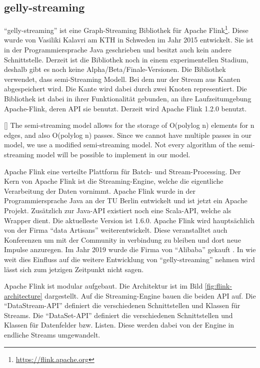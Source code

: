 \subsection{gelly-streaming}
\enquote{gelly-streaming} ist eine Graph-Streaming Bibliothek für Apache Flink\footnote{\url{https://flink.apache.org}}.
Diese wurde von Vasiliki Kalavri am KTH in Schweden im Jahr 2015 entwickelt.
Sie ist in der Programmiersprache Java geschrieben und besitzt auch kein andere
Schnittstelle. Derzeit ist die Bibliothek noch in einem experimentellen Stadium,
deshalb gibt es noch keine Alpha/Beta/Finale-Versionen. Die Bibliothek verwendet,
dass semi-Streaming Modell. Bei dem nur der Stream aus Kanten abgespeichert wird.
Die Kante wird dabei durch zwei Knoten representiert. Die Bibliothek ist dabei
in ihrer Funktionalität gebunden, an ihre Laufzeitumgebung
Apache-Flink, deren \gls{API} sie benutzt. Derzeit wird Apache Flink 1.2.0 benutzt.

[\cite{Bali2015}]{
The semi-streaming model allows for the storage of O(polylog n) elements for n
edges, and also O(polylog n) passes. Since we cannot have multiple passes in our
model, we use a modified semi-streaming model. Not every algorithm of the
semi-streaming model will be possible to implement in our model.
}

Apache Flink eine verteilte Plattform für Batch- und Stream-Processing. Der Kern
von Apache Flink ist die Streaming-Engine, welche die eigentliche Verarbeitung
der Daten vornimmt. Apache Flink wurde in der Programmiersprache Java an der TU
Berlin entwickelt und ist jetzt ein Apache Projekt. Zusätzlich zur Java-\gls{API}
existiert noch eine Scala-\gls{API}, welche als Wrapper dient. Die aktuelleste
Version ist 1.6.0. Apache Flink wird hauptsächlich von der Firma \enquote{data Artisans}
weiterentwickelt. Diese veranstalltet auch Konferenzen um mit der Community in
verbindung zu bleiben und dort neue Impulse anzuregen. Im Jahr 2019 wurde die
Firma von \enquote{Alibaba} gekauft \cite{Parbel2019}. In wie weit dies Einfluss
auf die weitere Entwicklung von \enquote{gelly-streaming} nehmen wird lässt sich
zum jetzigen Zeitpunkt nicht sagen.

Apache Flink ist modular aufgebaut. Die Architektur ist im Bild \ref{fig:flink-architecture}
dargestellt. Auf die Streaming-Engine bauen die beiden \gls{API} auf.
Die \enquote{DataStream-API} definiert die verschiedenen Schnittstellen und Klassen
für Streams. Die \enquote{DataSet-API} definiert die verschiedenen Schnittstellen
und Klassen für Datenfelder bzw. Listen. Diese werden dabei von der Engine in
endliche Streams umgewandelt.

